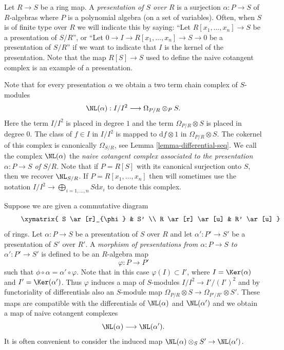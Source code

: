 \medskip\noindent
Let $R \to S$ be a ring map. A {\it presentation of $S$ over $R$} is
a surjection $\alpha : P \to S$ of $R$-algebras where $P$ is a polynomial
algebra (on a set of variables). Often, when $S$ is of finite type over $R$
we will indicate this by saying: ``Let $R[x_1, \ldots, x_n] \to S$ be a
presentation of $S/R$'', or
``Let $0 \to I \to R[x_1, \ldots, x_n] \to S \to 0$ be a presentation
of $S/R$'' if we want to indicate that $I$ is the kernel of the presentation.
Note that the map $R[S] \to S$ used to define the naive cotangent complex
is an example of a presentation.

\medskip\noindent
Note that for every presentation $\alpha$ we obtain a two term
chain complex of $S$-modules
$$
\NL(\alpha) : I/I^2 \longrightarrow \Omega_{P/R} \otimes_P S.
$$
Here the term $I/I^2$ is placed in degree $1$ and the term
$\Omega_{P/R} \otimes S$ is placed in degree $0$. The class of $f \in I$
in $I/I^2$ is mapped to $\text{d}f \otimes 1$ in $\Omega_{P/R} \otimes S$.
The cokernel of this complex is canonically $\Omega_{S/R}$,
see Lemma \ref{lemma-differential-seq}. We call the complex $\NL(\alpha)$
the {\it naive cotangent complex associated to the
presentation $\alpha : P \to S$ of $S/R$}. Note that if $P = R[S]$
with its canonical surjection onto $S$, then we recover $\NL_{S/R}$.
If $P = R[x_1, \ldots, x_n]$ then will sometimes use the notation
$I/I^2 \to \bigoplus_{i = 1, \ldots, n} S\text{d}x_i$
to denote this complex.

\medskip\noindent
Suppose we are given a commutative diagram
\begin{equation}
\label{equation-functoriality-NL}
\vcenter{
\xymatrix{
S \ar[r]_{\phi} & S' \\
R \ar[r] \ar[u] & R' \ar[u]
}
}
\end{equation}
of rings. Let $\alpha : P \to S$ be a presentation of $S$ over $R$ and let
$\alpha' : P' \to S'$ be a presentation of $S'$ over $R'$.
A {\it morphism of presentations from $\alpha : P \to S$ to
$\alpha' : P' \to S'$} is defined to be an $R$-algebra
map
$$
\varphi : P \to P'
$$
such that $\phi \circ \alpha = \alpha' \circ \varphi$. Note that
in this case $\varphi(I) \subset I'$, where $I = \Ker(\alpha)$
and $I' = \Ker(\alpha')$. Thus $\varphi$ induces a map
of $S$-modules $I/I^2 \to I'/(I')^2$ and by functoriality of
differentials also an $S$-module map
$\Omega_{P/R} \otimes S \to \Omega_{P'/R'} \otimes S'$.
These maps are compatible with the differentials of $\NL(\alpha)$ and
$\NL(\alpha')$ and we obtain a map of naive cotangent complexes
$$
\NL(\alpha) \longrightarrow \NL(\alpha').
$$
It is often convenient to consider the induced map
$\NL(\alpha) \otimes_S S' \to \NL(\alpha')$.

